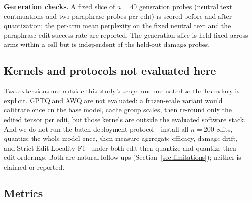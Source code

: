 \documentclass[preprint,12pt]{elsarticle}
\begin{document}
\textbf{Generation checks.} A fixed slice of $n = 40$ generation probes (neutral
text continuations and two paraphrase probes per edit) is scored before and after
quantization; the per-arm mean perplexity on the fixed neutral text and the
paraphrase edit-success rate are reported. The generation slice is held fixed
across arms within a cell but is independent of the held-out damage probes.

\subsection{Kernels and protocols not evaluated here}
\label{sec:method-track15}

Two extensions are outside this study's scope and are noted so the boundary is explicit.
GPTQ and AWQ are not evaluated: a frozen-scale variant would calibrate once on the base
model, cache group scales, then re-round only the edited tensor per edit, but those
kernels are outside the evaluated software stack. And we do not run the batch-deployment
protocol---install all $n = 200$ edits, quantize the whole model once, then measure
aggregate efficacy, damage drift, and Strict-Edit-Locality
F1~\cite{composable2024} under both edit-then-quantize and quantize-then-edit
orderings. Both are natural follow-ups (Section~\ref{sec:limitations}); neither is
claimed or reported.

\subsection{Metrics}
\label{sec:metrics}
\end{document}
